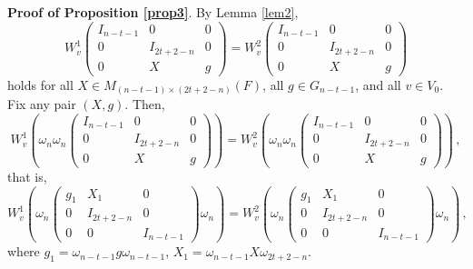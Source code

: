\documentclass[12pt]{amsart}
\begin{document}
\textbf{Proof of Proposition \ref{prop3}}.
By Lemma \ref{lem2}, 
\begin{equation*}
W_v^1 \begin{pmatrix}
I_{n-t-1} & 0 & 0\\
0 & I_{2t+2-n} & 0\\
0 & X & g
\end{pmatrix}=W_v^2 \begin{pmatrix}
I_{n-t-1} & 0 & 0\\
0 & I_{2t+2-n} & 0\\
0 & X & g
\end{pmatrix}
\end{equation*}
holds for all $X \in M_{(n-t-1) \times (2t+2-n)}(F)$, all $g \in G_{n-t-1}$, and all $v \in V_0$. Fix any pair $(X,g)$. Then, 
\begin{equation*}
W_v^1 \left(\omega_n \omega_n \begin{pmatrix}
I_{n-t-1} & 0 & 0\\
0 & I_{2t+2-n} & 0\\
0 & X & g
\end{pmatrix}\right)=W_v^2 \left(\omega_n \omega_n \begin{pmatrix}
I_{n-t-1} & 0 & 0\\
0 & I_{2t+2-n} & 0\\
0 & X & g
\end{pmatrix}\right)\,,
\end{equation*}
that is, 
\begin{equation*}
W_v^1 \left(\omega_n \begin{pmatrix}
g_1 & X_1 & 0\\
0 & I_{2t+2-n} & 0\\
0 & 0 & I_{n-t-1}
\end{pmatrix}\omega_n\right)=W_v^2 \left(\omega_n \begin{pmatrix}
g_1 & X_1 & 0\\
0 & I_{2t+2-n} & 0\\
0 & 0 & I_{n-t-1}
\end{pmatrix}\omega_n\right)\,,
\end{equation*}
where $g_1 = \omega_{n-t-1} g \omega_{n-t-1}$, $X_1=\omega_{n-t-1} X \omega_{2t+2-n}$. 
\end{document}
